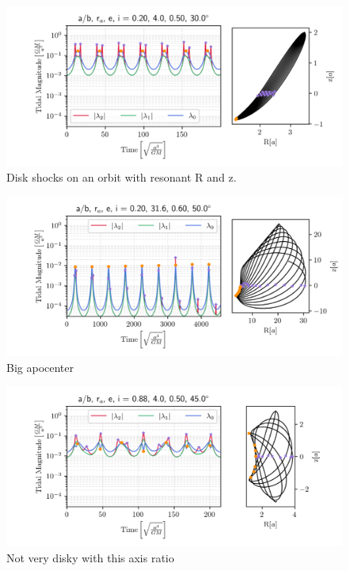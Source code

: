             \begin{figure}
                \includegraphics[width=\linewidth]{images/miyamoto_disc_shocks_ab_rp_e_i_0.20_4.0_0.50_30.0.png}
                \caption{Disk shocks on an orbit with resonant R and z.}
                \label{fig:miyamoto_disc_shocks_responant_R_z}
            \end{figure}
            
            \begin{figure}
                \includegraphics[width=\linewidth]{images/miyamoto_disc_shocks_ab_rp_e_i_0.20_31.6_0.60_50.0.png}
                \caption{Big apocenter}
                \label{fig:miyamoto_disc_shocks_big_apocenter}
            \end{figure}
            
            \begin{figure}
                \includegraphics[width=\linewidth]{images/miyamoto_disc_shocks_ab_rp_e_i_0.88_4.0_0.50_45.0.png}
                \caption{Not very disky with this axis ratio}
                \label{fig:miyamoto_disc_shocks_weak_shocks}
            \end{figure}


